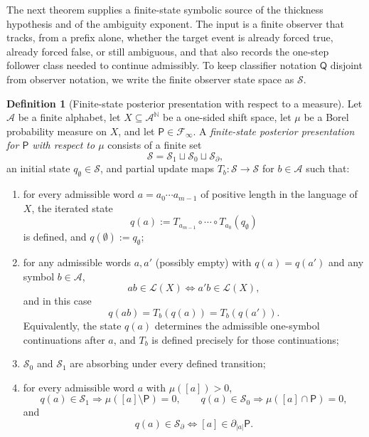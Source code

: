 \documentclass{etds}%
\numberwithin{equation}{section}
\theoremstyle{plain}
\theoremstyle{definition}
\newtheorem{definition}[theorem]{Definition}
\theoremstyle{remark}
\newcommand{\NN}{\mathbb{N}}
\begin{document}
The next theorem supplies a finite-state symbolic source of the thickness
hypothesis and of the ambiguity exponent.  The input is a finite observer that
tracks, from a prefix alone, whether the target event is already forced true,
already forced false, or still ambiguous, and that also records the one-step
follower class needed to continue admissibly.  To keep classifier notation
$\mathsf{Q}$ disjoint from observer notation, we write the finite observer
state space as $\mathcal{S}$.

\begin{definition}[Finite-state posterior presentation with respect to a measure]
\label{def:finite-posterior}
Let $\mathcal{A}$ be a finite alphabet, let $X\subseteq\mathcal{A}^{\NN}$ be a
one-sided shift space, let $\mu$ be a Borel probability measure on $X$, and
let $\mathsf{P}\in\mathcal{F}_\infty$.  A
\emph{finite-state posterior presentation for $\mathsf{P}$ with respect to
$\mu$} consists of a
finite set
\[
\mathcal{S}=\mathcal{S}_1\sqcup \mathcal{S}_0\sqcup \mathcal{S}_\partial,
\]
an initial state $q_\emptyset\in \mathcal{S}$, and partial update maps
$T_b:\mathcal{S}\to \mathcal{S}$ for $b\in\mathcal{A}$ such that:
\begin{enumerate}[label=(\arabic*)]
\item for every admissible word $a=a_0\cdots a_{m-1}$ of positive length in
  the language of $X$,
  the iterated state
  \[
  q(a):=T_{a_{m-1}}\circ\cdots\circ T_{a_0}(q_\emptyset)
  \]
  is defined, and $q(\emptyset):=q_\emptyset$;
\item for any admissible words $a,a'$ (possibly empty) with $q(a)=q(a')$ and
  any symbol $b\in\mathcal{A}$,
  \[
  ab\in\mathcal{L}(X)\Longleftrightarrow a'b\in\mathcal{L}(X),
  \]
  and in this case
  \[
  q(ab)=T_b(q(a))=T_b(q(a')).
  \]
  Equivalently, the state $q(a)$ determines the admissible one-symbol
  continuations after $a$, and $T_b$ is defined precisely for those
  continuations;
\item $\mathcal{S}_0$ and $\mathcal{S}_1$ are absorbing under every defined transition;
\item for every admissible word $a$ with $\mu([a])>0$,
  \[
  q(a)\in \mathcal{S}_1 \Rightarrow \mu([a]\setminus\mathsf{P})=0,\qquad
  q(a)\in \mathcal{S}_0 \Rightarrow \mu([a]\cap\mathsf{P})=0,
  \]
  and
  \[
  q(a)\in \mathcal{S}_\partial \Longleftrightarrow [a]\in\partial_{|a|}\mathsf{P}.
  \]
\end{enumerate}
\end{definition}
\end{document}

